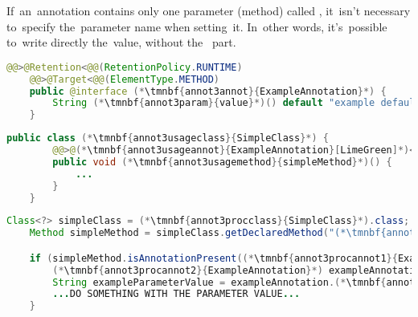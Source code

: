 \label{javaannotationparamvalue}
If~an~annotation contains only one parameter (method) called , it~isn't necessary to~specify the~parameter name when setting~it.
In~other words, it's~possible to~write directly the~value, without the~ part.

\example
\begin{lstlisting}[language=Java, title={Annotation with single parameter called \itq{value}}]
    @@>@Retention<@@(RetentionPolicy.RUNTIME)
    @@>@Target<@@(ElementType.METHOD)
    public @interface (*\tmnbf{annot3annot}{ExampleAnnotation}*) {
        String (*\tmnbf{annot3param}{value}*)() default "example default value";
    }
\end{lstlisting}
\begin{lstlisting}[language=Java, title={Setting the~parameter value~--~no~need to~write \mbitq{value = }}]
    public class (*\tmnbf{annot3usageclass}{SimpleClass}*) {
        @@>@(*\tmnbf{annot3usageannot}{ExampleAnnotation}[LimeGreen]*)<@@("new value")
        public void (*\tmnbf{annot3usagemethod}{simpleMethod}*)() {
            ...
        }
    }
\end{lstlisting}
\begin{lstlisting}[language=Java, title={Runtime annotation processing}]
    Class<?> simpleClass = (*\tmnbf{annot3procclass}{SimpleClass}*).class;
    Method simpleMethod = simpleClass.getDeclaredMethod("(*\tmnbf{annot3procmethod}{simpleMethod}[ForestGreen]*)");

    if (simpleMethod.isAnnotationPresent((*\tmnbf{annot3procannot1}{ExampleAnnotation}*).class)) {
        (*\tmnbf{annot3procannot2}{ExampleAnnotation}*) exampleAnnotation = simpleMethod.getAnnotation((*\tmnbf{annot3procannot3}{ExampleAnnotation}*).class);
        String exampleParameterValue = exampleAnnotation.(*\tmnbf{annot3procparam}{value}*)();
        ...DO SOMETHING WITH THE PARAMETER VALUE...
    }
\end{lstlisting}
\newpage

